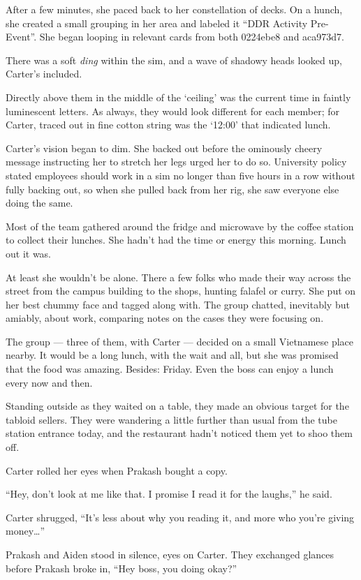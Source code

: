 After a few minutes, she paced back to her constellation of decks. On a hunch, she created a small grouping in her area and labeled it ``DDR Activity Pre-Event''. She began looping in relevant cards from both 0224ebe8 and aca973d7.

There was a soft \emph{ding} within the sim, and a wave of shadowy heads looked up, Carter's included.

Directly above them in the middle of the `ceiling' was the current time in faintly luminescent letters. As always, they would look different for each member; for Carter, traced out in fine cotton string was the `12:00' that indicated lunch.

Carter's vision began to dim. She backed out before the ominously cheery message instructing her to stretch her legs urged her to do so. University policy stated employees should work in a sim no longer than five hours in a row without fully backing out, so when she pulled back from her rig, she saw everyone else doing the same.

Most of the team gathered around the fridge and microwave by the coffee station to collect their lunches. She hadn't had the time or energy this morning. Lunch out it was.

At least she wouldn't be alone. There a few folks who made their way across the street from the campus building to the shops, hunting falafel or curry. She put on her best chummy face and tagged along with. The group chatted, inevitably but amiably, about work, comparing notes on the cases they were focusing on.

The group --- three of them, with Carter --- decided on a small Vietnamese place nearby. It would be a long lunch, with the wait and all, but she was promised that the food was amazing. Besides: Friday. Even the boss can enjoy a lunch every now and then.

Standing outside as they waited on a table, they made an obvious target for the tabloid sellers. They were wandering a little further than usual from the tube station entrance today, and the restaurant hadn't noticed them yet to shoo them off.

Carter rolled her eyes when Prakash bought a copy.

``Hey, don't look at me like that. I promise I read it for the laughs,'' he said.

Carter shrugged, ``It's less about why you reading it, and more who you're giving money\ldots{}''

Prakash and Aiden stood in silence, eyes on Carter. They exchanged glances before Prakash broke in, ``Hey boss, you doing okay?''

